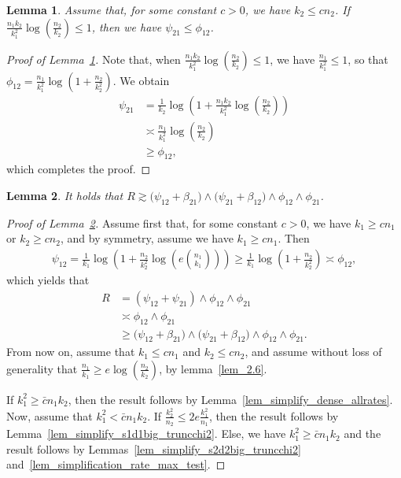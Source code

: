 \documentclass{article}
\newtheorem{lemma}{Lemma}
\begin{document}
\begin{lemma}\label{lem_psi_disappears}
        Assume that, for some constant $c>0$, we have $k_2 \leq c n_2$. 
        If $\frac{n_1k_2}{k_1^2} \log\left(\frac{n_2}{k_2}\right)\leq 1$, then we have $\psi_{21} \leq \phi_{12}$. 
    \end{lemma}

    \begin{proof}[Proof of Lemma~\ref{lem_psi_disappears}]
        Note that, when $\frac{n_1k_2}{k_1^2} \log\left(\frac{n_2}{k_2}\right)\leq 1$, we have $\frac{n_1}{k_1^2}\leq 1$, so that $\phi_{12} = \frac{n_1}{k_1^2}\log\left(1+\frac{n_2}{k_2^2}\right)$. We obtain
    \begin{align*}
        \psi_{21} &= \frac{1}{k_2} \log\left(1+\frac{n_1k_2}{k_1^2} \log\left(\frac{n_2}{k_2}\right)\right)\\
        & \asymp \frac{n_1}{k_1^2} \log\left(\frac{n_2}{k_2}\right)\\
        & \geq \phi_{12},
    \end{align*}
    which completes the proof.
    \end{proof}


    \begin{lemma}\label{lem_simplified_rate_for_UB}
        It holds that $R \gtrsim \big(\psi_{12} + \beta_{21}\big) \land \big(\psi_{21} + \beta_{12}\big) \land \phi_{12} \land \phi_{21}$.
    \end{lemma}

    \begin{proof}[Proof of Lemma~\ref{lem_simplified_rate_for_UB}]
    Assume first that, for some constant $c>0$, we have $k_1 \geq c n_1$ or $k_2 \geq c n_2$, and by symmetry, assume we have $k_1 \geq c n_1$. 
    Then 
    \begin{align*}
        \psi_{12} = \frac{1}{k_1} \log\left(1+ \frac{n_2}{k_2^2} \log\left(e {n_1 \choose k_1}\right)\right) \geq \frac{1}{k_1} \log\left(1+ \frac{n_2}{k_2^2} \right) \asymp \phi_{12},
    \end{align*}
    which yields that
    \begin{align*}
        R &= (\psi_{12} + \psi_{21}) \land \phi_{12} \land \phi_{21}\\
        & \asymp \phi_{12} \land \phi_{21} \\
        &\geq \big(\psi_{12} + \beta_{21}\big) \land \big(\psi_{21} + \beta_{12}\big) \land \phi_{12} \land \phi_{21}.
    \end{align*}
    From now on, assume that $k_1 \leq c n_1$ and $k_2 \leq c n_2$, and assume without loss of generality that $\frac{n_1}{k_1} \geq e\log\left(\frac{n_2}{k_2}\right)$, by lemma~\ref{lem_2.6}. 

    If $k_1^2 \geq \bar c n_1 k_2$, then the result follows by Lemma~\ref{lem_simplify_dense_allrates}. Now, assume that $k_1^2 < \bar c n_1 k_2$. If $\frac{k^2_2}{n_2} \leq 2e\frac{k_1^2}{n_1}$, then the result follows by Lemma~\ref{lem_simplify_s1d1big_truncchi2}. 
    Else, we have $k_1^2 \geq \bar c n_1 k_2$ and the result follows by Lemmas~\ref{lem_simplify_s2d2big_truncchi2} and~\ref{lem_simplification_rate_max_test}.
        
    \end{proof}
\end{document}
